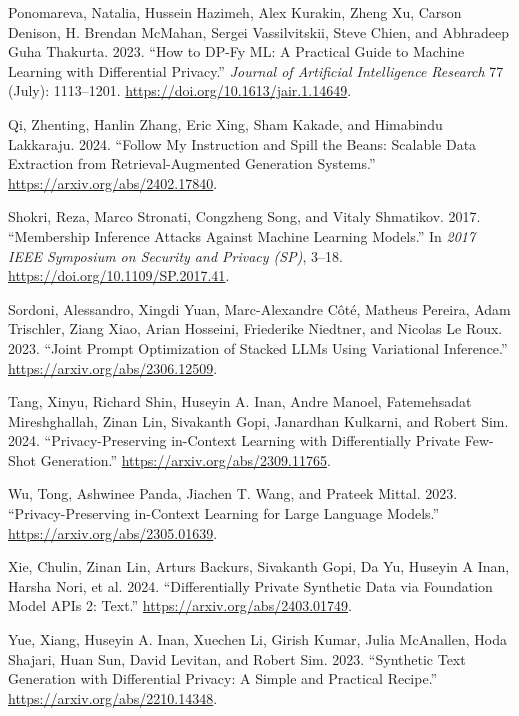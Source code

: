 \documentclass[
  12pt,
  a4paper,
]{article}
\newlength{\cslhangindent}
\newenvironment{CSLReferences}[2] %
 {\begin{list}{}{%
  \setlength{\itemindent}{0pt}
  \setlength{\leftmargin}{0pt}
  \setlength{\parsep}{0pt}
  \ifodd #1
   \setlength{\leftmargin}{\cslhangindent}
   \setlength{\itemindent}{-1\cslhangindent}
  \fi
  \setlength{\itemsep}{#2\baselineskip}}}
 {\end{list}}
\begin{document}
\begin{CSLReferences}{1}{0}
Ponomareva, Natalia, Hussein Hazimeh, Alex Kurakin, Zheng Xu, Carson
Denison, H. Brendan McMahan, Sergei Vassilvitskii, Steve Chien, and
Abhradeep Guha Thakurta. 2023. {``How to DP-Fy ML: A Practical Guide to
Machine Learning with Differential Privacy.''} \emph{Journal of
Artificial Intelligence Research} 77 (July): 1113--1201.
\url{https://doi.org/10.1613/jair.1.14649}.

Qi, Zhenting, Hanlin Zhang, Eric Xing, Sham Kakade, and Himabindu
Lakkaraju. 2024. {``Follow My Instruction and Spill the Beans: Scalable
Data Extraction from Retrieval-Augmented Generation Systems.''}
\url{https://arxiv.org/abs/2402.17840}.

Shokri, Reza, Marco Stronati, Congzheng Song, and Vitaly Shmatikov.
2017. {``Membership Inference Attacks Against Machine Learning
Models.''} In \emph{2017 IEEE Symposium on Security and Privacy (SP)},
3--18. \url{https://doi.org/10.1109/SP.2017.41}.

Sordoni, Alessandro, Xingdi Yuan, Marc-Alexandre Côté, Matheus Pereira,
Adam Trischler, Ziang Xiao, Arian Hosseini, Friederike Niedtner, and
Nicolas Le Roux. 2023. {``Joint Prompt Optimization of Stacked LLMs
Using Variational Inference.''} \url{https://arxiv.org/abs/2306.12509}.

Tang, Xinyu, Richard Shin, Huseyin A. Inan, Andre Manoel, Fatemehsadat
Mireshghallah, Zinan Lin, Sivakanth Gopi, Janardhan Kulkarni, and Robert
Sim. 2024. {``Privacy-Preserving in-Context Learning with Differentially
Private Few-Shot Generation.''} \url{https://arxiv.org/abs/2309.11765}.

Wu, Tong, Ashwinee Panda, Jiachen T. Wang, and Prateek Mittal. 2023.
{``Privacy-Preserving in-Context Learning for Large Language Models.''}
\url{https://arxiv.org/abs/2305.01639}.

Xie, Chulin, Zinan Lin, Arturs Backurs, Sivakanth Gopi, Da Yu, Huseyin A
Inan, Harsha Nori, et al. 2024. {``Differentially Private Synthetic Data
via Foundation Model APIs 2: Text.''}
\url{https://arxiv.org/abs/2403.01749}.

Yue, Xiang, Huseyin A. Inan, Xuechen Li, Girish Kumar, Julia McAnallen,
Hoda Shajari, Huan Sun, David Levitan, and Robert Sim. 2023.
{``Synthetic Text Generation with Differential Privacy: A Simple and
Practical Recipe.''} \url{https://arxiv.org/abs/2210.14348}.


\end{CSLReferences}
\end{document}
